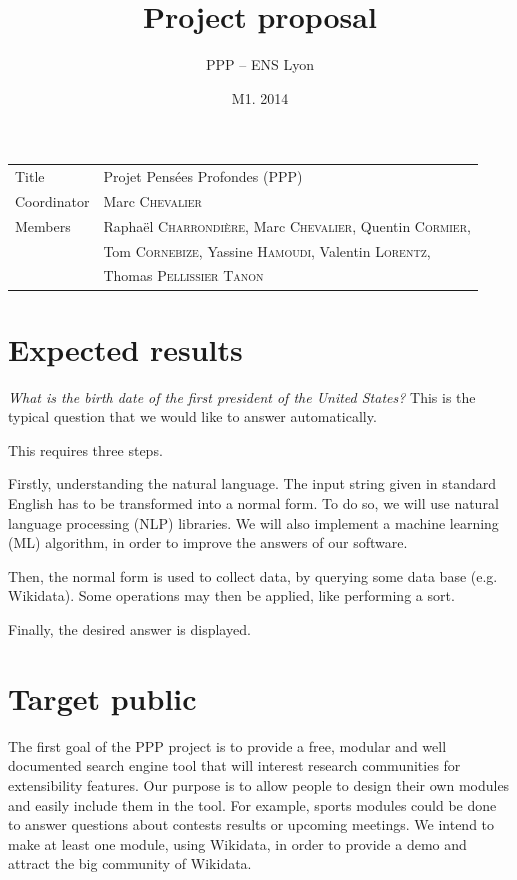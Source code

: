 \documentclass[a4paper,10pt]{article}
\title{Project proposal}
\author{PPP \--- ENS Lyon}
\date{M1. 2014}
\begin{document}
\maketitle

\begin{tabular}{|ll|}
\hline
Title & Projet Pensées Profondes (PPP)\\
Coordinator & Marc \textsc{Chevalier}\\
Members & Raphaël \textsc{Charrondière}, Marc \textsc{Chevalier}, Quentin \textsc{Cormier}, \\
        & Tom \textsc{Cornebize}, Yassine \textsc{Hamoudi}, Valentin \textsc{Lorentz},\\
        & Thomas \textsc{Pellissier} \textsc{Tanon}\\
\hline
\end{tabular}

\section{Expected results}
\emph{What is the birth date of the first president of the United States?} This is the typical question that we would like to answer automatically.

This requires three steps. 

Firstly, understanding the natural language. The input string given in standard English has to be transformed into a normal form. To do so, we will use natural language processing (NLP) libraries. We will also implement a machine learning (ML) algorithm, in order to improve the answers of our software.

Then, the normal form is used to collect data, by querying some data base (e.g. Wikidata). Some operations may then be applied, like performing a sort.

Finally, the desired answer is displayed.


\section{Target public}

The first goal of the PPP project is to provide a free, modular and well documented search engine tool that will interest research communities for extensibility features. Our purpose is to allow people to design their own modules and easily include them in the tool. For example, sports modules could be done to answer questions about contests results or upcoming meetings. We intend to make at least one module, using Wikidata, in order to provide a demo and attract the big community of Wikidata.
\end{document}
